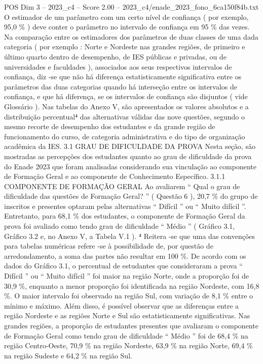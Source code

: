 \begin{textsample}{POS Dim 3 – 2023\_c4 – Score 2.00 – 2023\_c4/enade\_2023\_fono\_6ca150f84b.txt}
O estimador de um parâmetro com um certo nível de confiança ( por exemplo, 95,0 \% ) deve conter o parâmetro no intervalo de confiança em 95 \% das vezes.
Na comparação entre os estimadores dos parâmetros de duas classes de uma dada categoria ( por exemplo : Norte e Nordeste nas grandes regiões, de primeiro e último quarto dentro de desempenho, de IES públicas e privadas, ou de universidades e faculdades ), associados aos seus respectivos intervalos de confiança, diz -se que não há diferença estatisticamente significativa entre os parâmetros das duas categorias quando há interseção entre os intervalos de confiança, e que há diferença, se os intervalos de confiança são disjuntos ( vide Glossário ).
Nas tabelas do Anexo V, são apresentados os valores absolutos e a distribuição percentual⁴ das alternativas válidas das nove questões, segundo o mesmo recorte de desempenho dos estudantes e da grande região de funcionamento do curso, de categoria administrativa e do tipo de organização acadêmica da IES. 3.1 GRAU DE DIFICULDADE DA PROVA Nesta seção, são mostradas as percepções dos estudantes quanto ao grau de dificuldade da prova do Enade 2023 que foram analisadas considerando sua vinculação ao componente de Formação Geral e ao componente de Conhecimento Específico. 3.1.1 COMPONENTE DE FORMAÇÃO GERAL Ao avaliarem “ Qual o grau de dificuldade das questões de Formação Geral? ” ( Questão 6 ), 20,7 \% do grupo de inscritos e presentes optaram pelas alternativas “ Difícil ” ou “ Muito difícil ”.
Entretanto, para 68,1 \% dos estudantes, o componente de Formação Geral da prova foi avaliado como tendo grau de dificuldade “ Médio ” ( Gráfico 3.1, Gráfico 3.2 e, no Anexo V, a Tabela V.1 ). ⁴ Reitera -se que uma das convenções para tabelas numéricas refere -se à possibilidade de, por questão de arredondamento, a soma das partes não resultar em 100 \%.
De acordo com os dados do Gráfico 3.1, o percentual de estudantes que consideraram a prova “ Difícil ” ou “ Muito difícil ” foi maior na região Norte, onde a proporção foi de 30,9 \%, enquanto a menor proporção foi identificada na região Nordeste, com 16,8 \%.
O maior intervalo foi observado na região Sul, com variação de 8,1 \% entre o mínimo e máximo.
Além disso, é possível observar que as diferenças entre a região Nordeste e as regiões Norte e Sul são estatisticamente significativas.
Nas grandes regiões, a proporção de estudantes presentes que avaliaram o componente de Formação Geral como tendo grau de dificuldade “ Médio ” foi de 68,4 \% na região Centro-Oeste, 70,9 \% na região Nordeste, 63,9 \% na região Norte, 69,4 \% na região Sudeste e 64,2 \% na região Sul.

\end{textsample}

